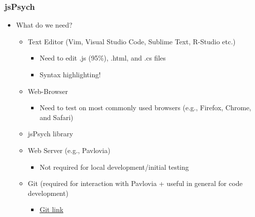 \documentclass[t]{beamer}
\begin{document}
\begin{frame}[fragile]
    \frametitle{jsPsych}
    \begin{itemize}
        \item What do we need?
            \begin{itemize}\scriptsize
                \item Text Editor (Vim, Visual Studio Code, Sublime Text, R-Studio etc.)
                    \begin{itemize}\tiny
                        \item Need to edit .js (95\%), .html, and .cs files
                        \item Syntax highlighting!
                    \end{itemize}
                \item Web-Browser  
                    \begin{itemize}\tiny
                        \item Need to test on most commonly used browsers (e.g., Firefox, Chrome, and Safari)
                    \end{itemize}
                \item jsPsych library
                \item Web Server (e.g., Pavlovia)
                    \begin{itemize}\tiny
                        \item Not required for local development/initial testing
                    \end{itemize}
                \item Git (required for interaction with Pavlovia + useful in general for code development) 
                    \begin{itemize}\tiny
                        \item \href{https://git-scm.com/}{Git link}
                    \end{itemize}
            \end{itemize}
    \end{itemize}
\end{frame}
\end{document}
